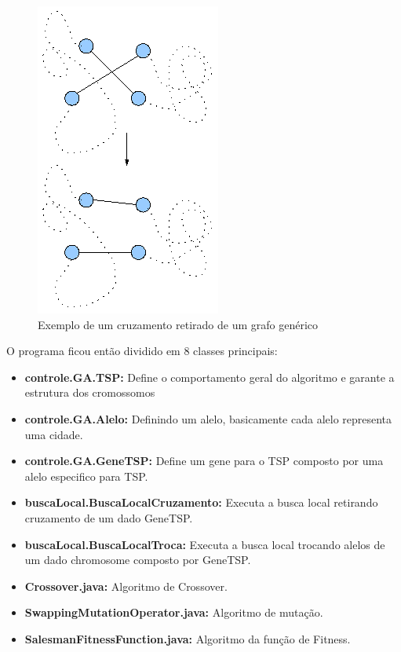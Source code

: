 \documentclass{acm_proc_article-sp}
\begin{document}
\begin{figure}[ht]
 \begin{center}
  \includegraphics[scale=0.5]{imagens/grafo.png} 
  \caption{Exemplo de um cruzamento retirado de um grafo genérico}
  \label{fig:grafo}
 \end{center}
\end{figure}

O programa ficou então dividido em 8 classes principais:

\begin{itemize}
	\item \textbf{controle.GA.TSP:} Define o comportamento geral do algoritmo e garante a estrutura dos cromossomos
	\item \textbf{controle.GA.Alelo:} Definindo um alelo, basicamente cada alelo representa uma cidade.
	\item \textbf{controle.GA.GeneTSP:} Define um gene para o TSP composto por uma alelo especifico para TSP.
	\item \textbf{buscaLocal.BuscaLocalCruzamento:} Executa a busca local retirando cruzamento de um dado GeneTSP.
	\item \textbf{buscaLocal.BuscaLocalTroca:} Executa a busca local trocando alelos de um dado chromosome composto por GeneTSP.
	\item \textbf{Crossover.java:} Algoritmo de Crossover.
	\item \textbf{SwappingMutationOperator.java:} Algoritmo de mutação.
	\item \textbf{SalesmanFitnessFunction.java:} Algoritmo da função de Fitness.
\end{itemize}
\end{document}

